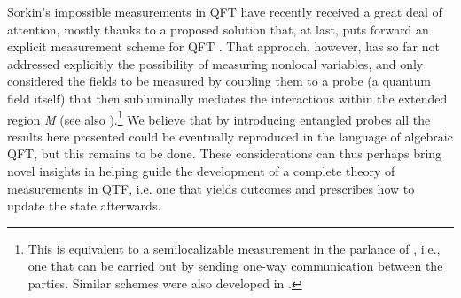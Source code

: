 \documentclass[a4paper,twocolumn,11pt,accepted=2024-02-14]{quantumarticle}
\begin{document}
Sorkin's impossible measurements in QFT have recently received a great deal of attention, mostly thanks to a proposed solution that, at last, puts forward an explicit measurement scheme for QFT \cite{fewster2020quantum, fewster2020generally, bostelmann2021impossible, fewster2023measurement}. %
That approach, however,  has so far not addressed explicitly the possibility of measuring nonlocal variables, and only considered the fields to be measured by coupling them to a probe (a quantum field itself) that then subluminally mediates the interactions within the extended region \textit{M} (see also \cite{van2021relativistic}).\footnote{This is equivalent to a semilocalizable measurement in the parlance of \cite{beckman2001causal, eggeling2002semicausal}, i.e., one that can be carried out by sending one-way communication between the parties. Similar schemes were also developed in \cite{groisman2001nonlocal}.} We believe that by introducing entangled probes all the results here presented could be eventually reproduced in the language of algebraic QFT, but this remains to be done. %
These considerations can thus perhaps bring novel insights in helping guide the development of a complete theory of measurements in QTF, i.e. one that yields outcomes and prescribes how to update the state afterwards.
\end{document}
